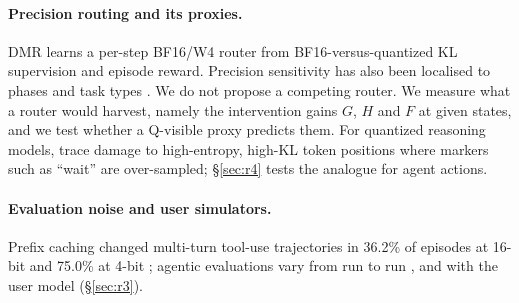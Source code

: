 \paragraph{Precision routing and its proxies.} DMR \citep{li2026dynamicmp} learns a per-step BF16/W4 router from BF16-versus-quantized KL supervision and episode reward. Precision sensitivity has also been localised to phases \citep{lu2026mixquant} and task types \citep{zhang2026quantclaw}. We do not propose a competing router. We measure what a router would harvest, namely the intervention gains $G$, $H$ and $F$ at given states, and we test whether a Q-visible proxy predicts them. For quantized reasoning models, \citet{lotfi2026quantized} trace damage to high-entropy, high-KL token positions where markers such as ``wait'' are over-sampled; \S\ref{sec:r4} tests the analogue for agent actions.

\paragraph{Evaluation noise and user simulators.} Prefix caching changed multi-turn tool-use trajectories in 36.2\% of episodes at 16-bit and 75.0\% at 4-bit \citep{patodiya2026same}; agentic evaluations vary from run to run \citep{bjarnason2026randomness,chen2026noisefloor}, and with the user model (\S\ref{sec:r3}). %
